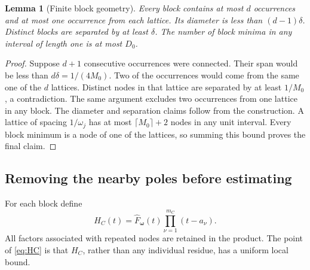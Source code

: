 \documentclass[11pt,a4paper]{article}
\numberwithin{equation}{section}
\newtheorem{lemma}[theorem]{Lemma}
\theoremstyle{definition}
\theoremstyle{remark}
\newcommand{\bw}{\boldsymbol\omega}
\begin{document}
\begin{lemma}[Finite block geometry]
\label{lem:geometry}
Every block contains at most $d$ occurrences and at most one occurrence
from each lattice. Its diameter is less than $(d-1)\delta$. Distinct blocks
are separated by at least $\delta$. The number of block minima in any
interval of length one is at most $D_0$.
\end{lemma}
\begin{proof}
Suppose $d+1$ consecutive occurrences were connected. Their span would be
less than $d\delta=1/(4M_0)$. Two of the occurrences would come from the
same one of the $d$ lattices. Distinct nodes in that lattice are separated
by at least $1/M_0$, a contradiction. The same argument excludes two
occurrences from one lattice in any block. The diameter and separation
claims follow from the construction.
A lattice of spacing $1/\omega_j$ has at most
$\lceil M_0\rceil+2$ nodes in any unit interval. Every block minimum is a
node of one of the lattices, so summing this bound proves the final claim.
\end{proof}

\subsection{Removing the nearby poles before estimating}
For each block define
\begin{equation}
 H_C(t)=\widehat F_{\bw}(t)\prod_{\nu=1}^{m_C}(t-a_\nu).
 \label{eq:HC}
\end{equation}
All factors associated with repeated nodes are retained in the product.
The point of \eqref{eq:HC} is that $H_C$, rather than any individual
residue, has a uniform local bound.
\end{document}
